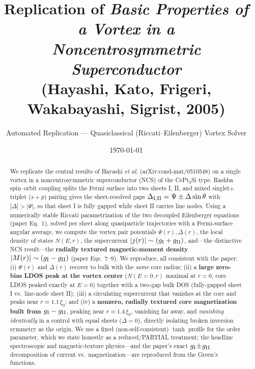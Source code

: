 \documentclass[11pt]{article}
\title{Replication of \emph{Basic Properties of a Vortex in a\\
Noncentrosymmetric Superconductor}\\ (Hayashi, Kato, Frigeri, Wakabayashi, Sigrist, 2005)}
\author{Automated Replication --- Quasiclassical (Riccati--Eilenberger) Vortex Solver}
\date{\today}
\begin{document}
\maketitle

\begin{abstract}
We replicate the central results of Hayashi \emph{et al.}
(arXiv:cond-mat/0510548) on a single vortex in a noncentrosymmetric
superconductor (NCS) of the CePt$_3$Si type. Rashba spin--orbit coupling
splits the Fermi surface into two sheets I, II, and mixed singlet$+$triplet
($s+p$) pairing gives the sheet-resolved gaps
$\Delta_{\rm I,II}=\Psi\pm\Delta\sin\theta$ with $|\Delta|>|\Psi|$, so that
sheet I is fully gapped while sheet II carries line nodes. Using a numerically
stable Riccati parametrization of the two decoupled Eilenberger equations
(paper Eq.~1), solved per sheet along quasiparticle trajectories with a
Fermi-surface angular average, we compute the vortex pair potentials
$\Psi(r),\Delta(r)$, the local density of states $N(E,r)$, the supercurrent
$|j(r)|\sim(g_{\rm I}+g_{\rm II})$, and---the distinctive NCS result---the
\textbf{radially textured magnetic-moment density} $|M(r)|\sim(g_{\rm
I}-g_{\rm II})$ (paper Eqs.~7--9). We reproduce, all consistent with the
paper: (i) $\Psi(r)$ and $\Delta(r)$ recover to bulk with the \emph{same} core
radius; (ii) a \textbf{large zero-bias LDOS peak at the vortex center}
($N(E{=}0,r)$ maximal at $r=0$, core LDOS peaked exactly at $E=0$) together
with a two-gap bulk DOS (fully-gapped sheet I vs.\ line-node sheet II); (iii) a
circulating supercurrent that vanishes at the core and peaks near
$r\simeq1.1\,\xi_0$; and (iv) a \textbf{nonzero, radially textured core
magnetization built from $g_{\rm I}-g_{\rm II}$}, peaking near
$r\simeq1.4\,\xi_0$, vanishing far away, and \emph{vanishing identically} in a
control with equal sheets ($\Delta=0$), directly isolating broken inversion
symmetry as the origin. We use a fixed (non-self-consistent) $\tanh$ profile
for the order parameter, which we state honestly as a reduced/PARTIAL
treatment; the headline spectroscopic and magnetic-texture physics---and the
paper's exact $g_{\rm I}\!\pm\!g_{\rm II}$ decomposition of current vs.\
magnetization---are reproduced from the Green's functions.
\end{abstract}
\end{document}
